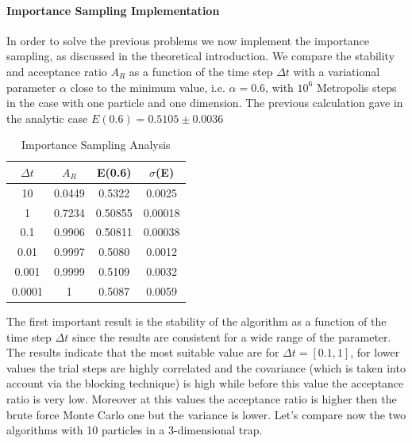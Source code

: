 \documentclass[10pt,a4paper,titlepage]{article}
\begin{document}
\paragraph*{Importance Sampling Implementation} In order to solve the previous problems we now implement the importance sampling, as discussed in the theoretical introduction. We compare the stability and acceptance ratio $A_R$ as a function of the time step $\Delta t$ with a variational parameter $\alpha$ close to the minimum value, i.e. $\alpha=0.6$, with $10^6$ Metropolis steps in the case with one particle and one dimension. The previous calculation gave in the analytic case $E(0.6)= 0.5105 \pm 0.0036$
\begin{table}[H]
\caption{{\footnotesize Importance Sampling Analysis  }}
\begin{center}
\begin{tabular}[t]{c c c c}
\hline
$\Delta t$ & $A_R$ & E(0.6) &$\sigma $(E) \\\hline
10 &0.0449 &0.5322& 0.0025 \\
1 &0.7234 &0.50855 &0.00018 \\
0.1& 0.9906 &0.50811 &0.00038 \\
0.01 &0.9997 &0.5080 &0.0012 \\
0.001 &0.9999 &0.5109 &0.0032 \\
0.0001 &1& 0.5087 &0.0059 \\
\hline
\end{tabular}
\end{center}
\end{table}
\noindent The first important result is the stability of the algorithm as a function of the  time step $\Delta t$ since the results are consistent for a wide range of the parameter.
The results indicate that the most suitable value are for $\Delta t = [0.1,1]$, for lower values the trial steps are highly correlated and the covariance (which is taken into account via the blocking technique) is high while before this value the acceptance ratio is very low. Moreover at this values the acceptance ratio is higher then the brute force Monte Carlo one but the variance is lower. Let's compare now the two algorithms with 10 particles in a 3-dimensional trap.\\
\end{document}
